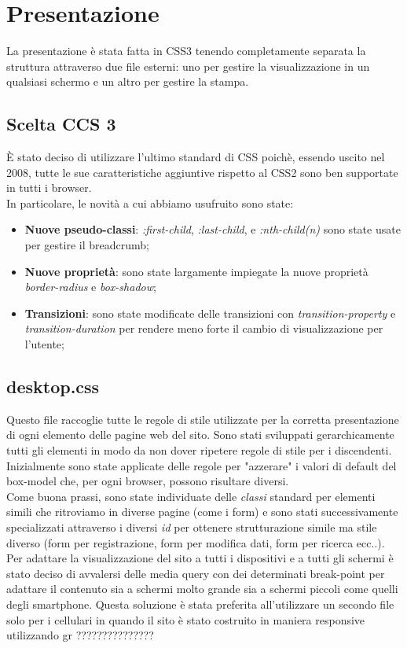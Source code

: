 \section{Presentazione}
	La presentazione è stata fatta in CSS3 tenendo completamente separata la struttura attraverso due file esterni: uno per gestire la visualizzazione in un qualsiasi schermo e un altro per gestire la stampa.
	\subsection{Scelta CCS 3}
	È stato deciso di utilizzare l'ultimo standard di CSS poichè, essendo uscito nel 2008, tutte le sue caratteristiche aggiuntive rispetto al CSS2 sono ben supportate in tutti i browser. \\ In particolare, le novità a cui abbiamo usufruito sono state:
	\begin{itemize}
		\item \textbf{Nuove pseudo-classi}: \emph{:first-child}, \emph{:last-child}, e \emph{:nth-child(n)} sono state usate per gestire il breadcrumb;
		\item \textbf{Nuove proprietà}: sono state largamente impiegate la nuove proprietà \emph{border-radius} e \emph{box-shadow};
		\item \textbf{Transizioni}: sono state modificate delle transizioni con \emph{transition-property} e \emph{transition-duration} per rendere meno forte il cambio di visualizzazione per l'utente;
	\end{itemize}
	\subsection{desktop.css}
	Questo file raccoglie tutte le regole di stile utilizzate per la corretta presentazione di ogni elemento delle pagine web del sito. Sono stati sviluppati gerarchicamente tutti gli elementi in modo da non dover ripetere regole di stile per i discendenti. \\
	Inizialmente sono state applicate delle regole per "azzerare" i valori di default del box-model che, per ogni browser, possono risultare diversi.\\
	Come buona prassi, sono state individuate delle \emph{classi} standard per elementi simili che ritroviamo in diverse pagine (come i form) e sono stati successivamente specializzati attraverso i diversi \emph{id} per ottenere strutturazione simile ma stile diverso (form per registrazione, form per modifica dati, form per ricerca ecc..).\\
	Per adattare la visualizzazione del sito a tutti i dispositivi e a tutti gli schermi è stato deciso di avvalersi delle media query con dei determinati break-point per adattare il contenuto sia a schermi molto grande sia a schermi piccoli come quelli degli smartphone. Questa soluzione è stata preferita all'utilizzare un secondo file solo per i cellulari in quando il sito è stato costruito in maniera responsive utilizzando gr ???????????????
	
